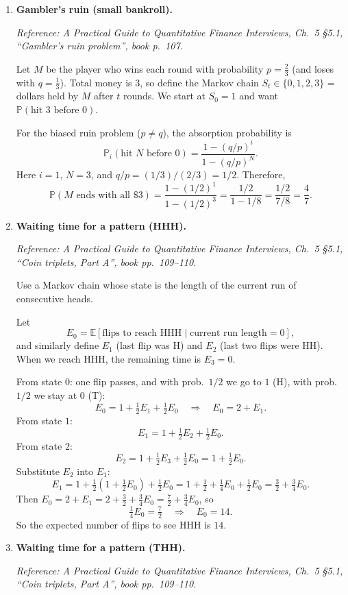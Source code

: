 \documentclass[11pt]{article}
\begin{document}
\begin{enumerate}[leftmargin=*, itemsep=1.0em]
\item \textbf{Gambler's ruin (small bankroll).}

\textit{Reference: A Practical Guide to Quantitative Finance Interviews, Ch.\ 5 \S5.1, ``Gambler's ruin problem'', book p.\ 107.}

\medskip
Let $M$ be the player who wins each round with probability $p=\tfrac{2}{3}$ (and loses with $q=\tfrac{1}{3}$).
Total money is $3$, so define the Markov chain $S_t\in\{0,1,2,3\}$ = dollars held by $M$ after $t$ rounds.
We start at $S_0=1$ and want $\mathbb{P}(\text{hit }3\text{ before }0)$.

For the biased ruin problem ($p\neq q$), the absorption probability is
\[
\mathbb{P}_{i}(\text{hit }N\text{ before }0)=\frac{1-(q/p)^i}{1-(q/p)^N}.
\]
Here $i=1$, $N=3$, and $q/p=(1/3)/(2/3)=1/2$. Therefore,
\[
\mathbb{P}(M\text{ ends with all \$3})=\frac{1-(1/2)^1}{1-(1/2)^3}
=\frac{1/2}{1-1/8}
=\frac{1/2}{7/8}
=\frac{4}{7}.
\]

\item \textbf{Waiting time for a pattern (HHH).}

\textit{Reference: A Practical Guide to Quantitative Finance Interviews, Ch.\ 5 \S5.1, ``Coin triplets, Part A'', book pp.\ 109--110.}

\medskip
Use a Markov chain whose state is the length of the current run of consecutive heads.

Let
\[
E_0=\mathbb{E}[\text{flips to reach HHH}\mid \text{current run length}=0],
\]
and similarly define $E_1$ (last flip was H) and $E_2$ (last two flips were HH). When we reach HHH, the remaining time is $E_3=0$.

From state $0$: one flip passes, and with prob.\ $1/2$ we go to $1$ (H), with prob.\ $1/2$ we stay at $0$ (T):
\[
E_0=1+\tfrac12 E_1+\tfrac12 E_0
\quad\Longrightarrow\quad
E_0=2+E_1.
\]
From state $1$:
\[
E_1=1+\tfrac12 E_2+\tfrac12 E_0.
\]
From state $2$:
\[
E_2=1+\tfrac12 E_3+\tfrac12 E_0
=1+\tfrac12 E_0.
\]
Substitute $E_2$ into $E_1$:
\[
E_1=1+\tfrac12(1+\tfrac12 E_0)+\tfrac12 E_0
=1+\tfrac12+\tfrac14 E_0+\tfrac12 E_0
=\tfrac32+\tfrac34 E_0.
\]
Then $E_0=2+E_1=2+\tfrac32+\tfrac34 E_0=\tfrac72+\tfrac34 E_0$, so
\[
\tfrac14 E_0=\tfrac72
\quad\Longrightarrow\quad
E_0=14.
\]
So the expected number of flips to see HHH is $\boxed{14}$.

\item \textbf{Waiting time for a pattern (THH).}

\textit{Reference: A Practical Guide to Quantitative Finance Interviews, Ch.\ 5 \S5.1, ``Coin triplets, Part A'', book pp.\ 109--110.}


\end{enumerate}
\end{document}
